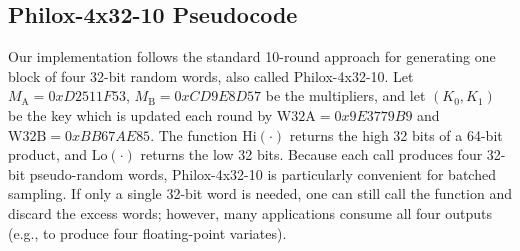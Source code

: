 \subsection{Philox-4x32-10 Pseudocode}
Our implementation follows the standard 10-round approach for generating one block of four 32-bit random words, also called Philox-4x32-10. Let \(M_{\mathrm{A}}=0xD2511F53\), \(M_{\mathrm{B}}=0xCD9E8D57\) be the multipliers, and let \((K_0, K_1)\) be the key which is updated each round by \(\mathrm{W32A}=0x9E3779B9\) and \(\mathrm{W32B}=0xBB67AE85\). The function \(\text{Hi}(\cdot)\) returns the high 32 bits of a 64-bit product, and \(\text{Lo}(\cdot)\) returns the low 32 bits. Because each call produces four 32-bit pseudo-random words, Philox-4x32-10 is particularly convenient for batched sampling. If only a single 32-bit word is needed, one can still call the function and discard the excess words; however, many applications consume all four outputs (e.g., to produce four floating-point variates).





